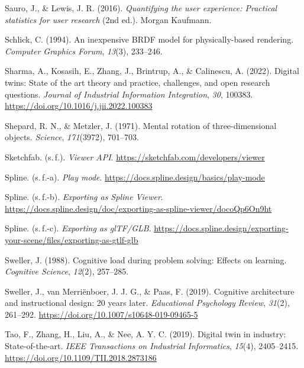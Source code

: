 \begin{list}{}
\item Sauro, J., \& Lewis, J. R. (2016). \textit{Quantifying the user experience: Practical statistics for user research} (2nd ed.). Morgan Kaufmann.

\item Schlick, C. (1994). An inexpensive BRDF model for physically-based rendering. \textit{Computer Graphics Forum}, \textit{13}(3), 233--246.

\item Sharma, A., Kosasih, E., Zhang, J., Brintrup, A., \& Calinescu, A. (2022). Digital twins: State of the art theory and practice, challenges, and open research questions. \textit{Journal of Industrial Information Integration}, \textit{30}, 100383. \url{https://doi.org/10.1016/j.jii.2022.100383}

\item Shepard, R. N., \& Metzler, J. (1971). Mental rotation of three-dimensional objects. \textit{Science}, \textit{171}(3972), 701--703.

\item Sketchfab. (s.\,f.). \textit{Viewer API}. \url{https://sketchfab.com/developers/viewer}

\item Spline. (s.\,f.-a). \textit{Play mode}. \url{https://docs.spline.design/basics/play-mode}

\item Spline. (s.\,f.-b). \textit{Exporting as Spline Viewer}. \url{https://docs.spline.design/doc/exporting-as-spline-viewer/docoQp6On9ht}

\item Spline. (s.\,f.-c). \textit{Exporting as glTF/GLB}. \url{https://docs.spline.design/exporting-your-scene/files/exporting-as-gtlf-glb}

\item Sweller, J. (1988). Cognitive load during problem solving: Effects on learning. \textit{Cognitive Science}, \textit{12}(2), 257--285.

\item Sweller, J., van Merriënboer, J. J. G., \& Paas, F. (2019). Cognitive architecture and instructional design: 20 years later. \textit{Educational Psychology Review}, \textit{31}(2), 261--292. \url{https://doi.org/10.1007/s10648-019-09465-5}

\item Tao, F., Zhang, H., Liu, A., \& Nee, A. Y. C. (2019). Digital twin in industry: State-of-the-art. \textit{IEEE Transactions on Industrial Informatics}, \textit{15}(4), 2405--2415. \url{https://doi.org/10.1109/TII.2018.2873186}


\end{list}
